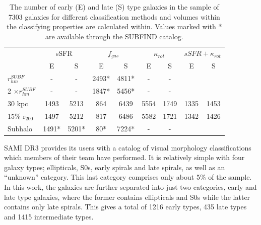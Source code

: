 \begin{table}
\begin{center}
\caption{The number of early (E) and late (S) type galaxies in the sample of 7303 galaxies for different classification methods and volumes within the classifying properties are calculated within. Values marked with * are available through the SUBFIND catalog.}
 \label{morph}
\begin{tabular}{ l| c c c c c c c c } 
 \hline
 \hline
   &\multicolumn{2}{c}{sSFR}&\multicolumn{2}{c}{$f_{gas}$}&\multicolumn{2}{c}{$\kappa_{rot}$}&\multicolumn{2}{c}{$sSFR+\kappa_{rot}$}\\
   &  E & S & E & S & E & S & E & S \\
 \hline
 $r_{hm}^{SUBF}$ & - & - & 2493* & 4811* & - & - & & \\ 
 2 $\times r_{hm}^{SUBF}$ & - & - & 1847* & 5456* & - & - & & \\ 
 30 kpc & 1493 & 5213 & 864 & 6439 & 5554 & 1749 &1335 & 1453 \\ 
 15\% r$_{200}$ & 1497 & 5212 & 817 & 6486 & 5582 & 1721 & 1342 & 1426 \\ 
 Subhalo & 1491* & 5201* & 80* & 7224* & - & - & &\\ 
 \hline 
 \end{tabular}
\end{center}
\end{table}

SAMI DR3 provides its users with a catalog of visual morphology classifications which members of their team have performed. It is relatively simple with four galaxy types; ellipticals, S0s, early spirals and late spirals, as well as an ``unknown'' category. This last category comprises only about 5\% of the sample. In this work, the galaxies are further separated into just two categories, early and late type galaxies, where the former contains ellipticals and S0s while the latter contains only late spirals. This gives a total of 1216 early types, 435 late types and 1415 intermediate types.
